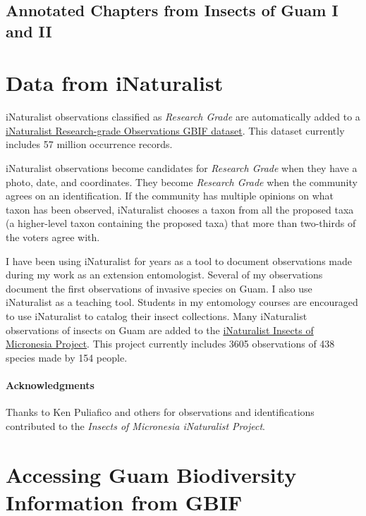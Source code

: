 \documentclass[12pt,letterpaper,english,bibliography=totocnumbered, abstract=on]{scrartcl}
\begin{document}
\subsection{Annotated Chapters from Insects of Guam I and II}
\newrefsection[blr]
\nocite{*}
\printbibliography[heading=none]



\pagebreak
\section{Data from iNaturalist}

iNaturalist observations classified as \textit{Research Grade} are automatically added to a \href{https://www.gbif.org/dataset/50c9509d-22c7-4a22-a47d-8c48425ef4a7}{iNaturalist Research-grade Observations GBIF dataset}. This dataset currently includes 57 million occurrence records. 

iNaturalist observations become candidates for \textit{Research Grade} when they have a photo, date, and coordinates. They become \textit{Research Grade} when the community agrees on an identification. If the community has multiple opinions on what taxon has been observed, iNaturalist chooses a taxon from all the proposed taxa (a higher-level taxon containing the proposed taxa) that more than two-thirds of the voters agree with.

I have been using iNaturalist for years as a tool to document observations made during my work as an extension entomologist. Several of my observations document the first observations of invasive species on Guam. I also use iNaturalist as a teaching tool. Students in my entomology courses are encouraged to use iNaturalist to catalog their insect collections. Many iNaturalist observations of insects on Guam are added to the \href{https://www.inaturalist.org/projects/insects-of-micronesia}{iNaturalist Insects of Micronesia Project}. This project currently includes 3605 observations of 438 species made by 154 people. 

\paragraph{Acknowledgments} Thanks to Ken Puliafico and others for observations and identifications contributed to the \textit{Insects of Micronesia iNaturalist Project}.





\pagebreak
\section{Accessing Guam Biodiversity Information from GBIF}
\newrefsection[my.bib]
\end{document}
